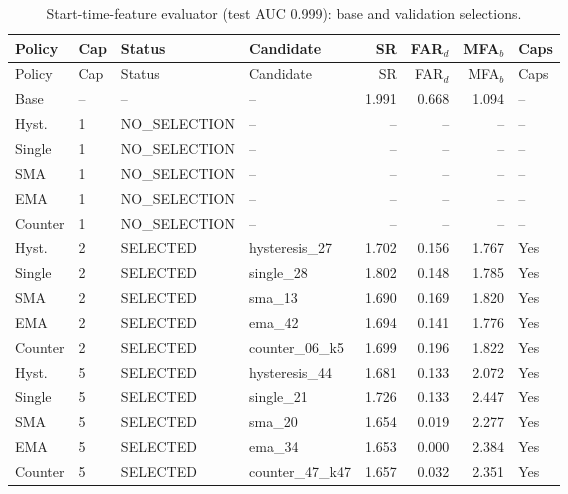 \par\medskip
{\footnotesize\setlength{\tabcolsep}{4pt}
\begin{longtable}{llllrrrl}
\caption{Start-time-feature evaluator (test AUC 0.999): base and validation selections.}\label{tab:s7_start}\\
\toprule
Policy & Cap & Status & Candidate & SR & FAR$_d$ & MFA$_b$ & Caps\\
\midrule
\endfirsthead
\toprule
Policy & Cap & Status & Candidate & SR & FAR$_d$ & MFA$_b$ & Caps\\
\midrule
\endhead
\bottomrule
\endfoot
Base & -- & -- & -- & 1.991 & 0.668 & 1.094 & --\\
Hyst. & 1 & NO\_SELECTION & -- & -- & -- & -- & --\\
Single & 1 & NO\_SELECTION & -- & -- & -- & -- & --\\
SMA & 1 & NO\_SELECTION & -- & -- & -- & -- & --\\
EMA & 1 & NO\_SELECTION & -- & -- & -- & -- & --\\
Counter & 1 & NO\_SELECTION & -- & -- & -- & -- & --\\
Hyst. & 2 & SELECTED & hysteresis\_27 & 1.702 & 0.156 & 1.767 & Yes\\
Single & 2 & SELECTED & single\_28 & 1.802 & 0.148 & 1.785 & Yes\\
SMA & 2 & SELECTED & sma\_13 & 1.690 & 0.169 & 1.820 & Yes\\
EMA & 2 & SELECTED & ema\_42 & 1.694 & 0.141 & 1.776 & Yes\\
Counter & 2 & SELECTED & counter\_06\_k5 & 1.699 & 0.196 & 1.822 & Yes\\
Hyst. & 5 & SELECTED & hysteresis\_44 & 1.681 & 0.133 & 2.072 & Yes\\
Single & 5 & SELECTED & single\_21 & 1.726 & 0.133 & 2.447 & Yes\\
SMA & 5 & SELECTED & sma\_20 & 1.654 & 0.019 & 2.277 & Yes\\
EMA & 5 & SELECTED & ema\_34 & 1.653 & 0.000 & 2.384 & Yes\\
Counter & 5 & SELECTED & counter\_47\_k47 & 1.657 & 0.032 & 2.351 & Yes\\
\end{longtable}}
